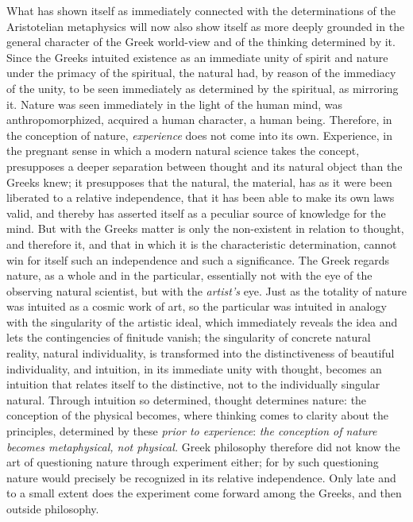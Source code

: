 What has shown itself as immediately connected with the determinations
of the Aristotelian metaphysics will now also show itself as more
deeply grounded in the general character of the Greek world-view and of
the thinking determined by it. Since the Greeks intuited existence as
an immediate unity of spirit and nature under the primacy of the
spiritual, the natural had, by reason of the immediacy of the unity, to
be seen immediately as determined by the spiritual, as mirroring it.
Nature was seen immediately in the light of the human mind, was
anthropomorphized, acquired a human character, a human being. Therefore,
in the conception of nature, \emph{experience} does not come into its
own. Experience, in the pregnant sense in which a modern natural
science takes the concept, presupposes a deeper separation between
thought and its natural object than the Greeks knew; it presupposes
that the natural, the material, has as it were been liberated to a
relative independence, that it has been able to make its own laws
valid, and thereby has asserted itself as a peculiar source of
knowledge for the mind. But with the Greeks matter is only the
non-existent in relation to thought, and therefore it, and that in
which it is the characteristic determination, cannot win for itself
such an independence and such a significance. The Greek regards
nature, as a whole and in the particular, essentially not with the eye
of the observing natural scientist, but with the \emph{artist's} eye.
Just as the totality of nature was intuited as a cosmic work of art, so
the particular was intuited in analogy with the singularity of the
artistic ideal, which immediately reveals the idea and lets the
contingencies of finitude vanish; the singularity of concrete natural
reality, natural individuality, is transformed into the distinctiveness
of beautiful individuality, and intuition, in its immediate unity with
thought, becomes an intuition that relates itself to the distinctive,
not to the individually singular natural. Through intuition
so determined, thought determines nature: the conception of the
physical becomes, where thinking comes to clarity about the principles,
determined by these \emph{prior to experience}: \emph{the conception of
nature becomes metaphysical, not physical.} Greek philosophy therefore
did not know the art of questioning nature through experiment either;
for by such questioning nature would precisely be recognized in its
relative independence. Only late and to a small extent does the
experiment come forward among the Greeks, and then outside philosophy.

